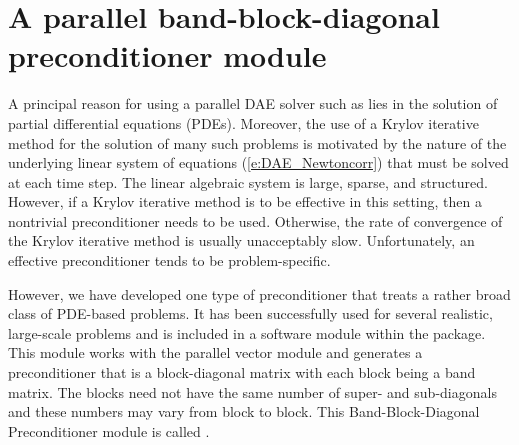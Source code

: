 {%
\section{A parallel band-block-diagonal preconditioner module}\label{sss:idabbdpre}

A principal reason for using a parallel DAE solver such as {\ida} lies
in the solution of partial differential equations (PDEs).  Moreover,
the use of a Krylov iterative method for the solution of many such
problems is motivated by the nature of the underlying linear system of
equations (\ref{e:DAE_Newtoncorr}) that must be solved at each time step.  The
linear algebraic system is large, sparse, and structured. However, if
a Krylov iterative method is to be effective in this setting, then a
nontrivial preconditioner needs to be used.  Otherwise, the rate of
convergence of the Krylov iterative method is usually unacceptably
slow.  Unfortunately, an effective preconditioner tends to be
problem-specific.

However, we have developed one type of preconditioner that treats a
rather broad class of PDE-based problems.  It has been successfully
used for several realistic, large-scale problems \cite{HiTa:98} and is
included in a software module within the {\ida} package. This module
works with the parallel vector module {\nvecp} and 
generates a preconditioner that is a block-diagonal matrix with each
block being a band matrix. The blocks need not have the same number of
super- and sub-diagonals and these numbers may vary from block to
block. This Band-Block-Diagonal Preconditioner module is called
{\idabbdpre}.

}
